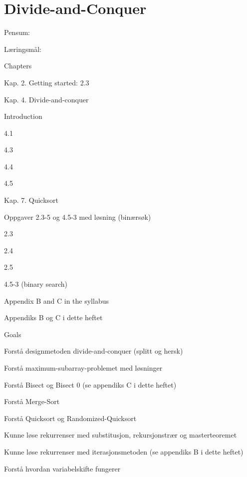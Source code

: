 \section{Divide-and-Conquer}

Pensum:

Læringsmål:

\begin{itemize}
    \item Chapters
    \begin{todolist}
        \item Kap. 2. Getting started: 2.3
        \item Kap. 4. Divide-and-conquer
            \begin{todolist}
                \item Introduction
                \item 4.1
                \item 4.3
                \item 4.4
                \item 4.5
            \end{todolist}
        \item Kap. 7. Quicksort
        \item Oppgaver 2.3-5 og 4.5-3 med løsning (binærsøk)
            \begin{todolist}
                \item 2.3
                \item 2.4
                \item 2.5
                \item 4.5-3 (binary search)
                \item Appendix B and C in the syllabus
            \end{todolist}
        \item Appendiks B og C i dette heftet
    \end{todolist}
        \item Goals 
    \begin{todolist}
        \item Forstå designmetoden divide-and-conquer (splitt og hersk)
        \item Forstå maximum-subarray-problemet med løsninger
        \item Forstå Bisect og Bisect 0 (se appendiks C i dette heftet)
        \item Forstå Merge-Sort
        \item Forstå Quicksort og Randomized-Quicksort
        \item Kunne løse rekurrenser med substitusjon, rekursjonstrær og masterteoremet
        \item Kunne løse rekurrenser med iterasjonsmetoden (se appendiks B i dette heftet)
        \item Forstå hvordan variabelskifte fungerer
    \end{todolist}
\end{itemize}

